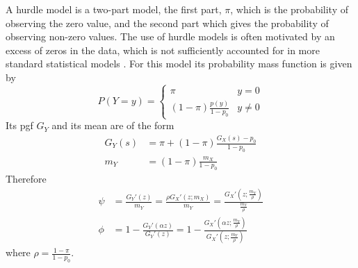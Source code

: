 \documentclass[useAMS,referee,usenatbib]{biom}
\begin{document}
A hurdle model is a two-part model, 
the first part, $\pi$, which is the probability of observing the  zero value, and the second part which gives the probability of observing non-zero values. 
The use of hurdle models is often motivated by an excess of zeros in the data, which is not sufficiently accounted for in more standard statistical models \cite{johnson2005univariate}. 
For this model its probability mass function is given by
\begin{equation*}\label{hd}
P(Y=y)= \left\{ \begin{array}{lc}
\pi & y=0 \\
(1-\pi)\frac{p(y)}{1-p_0}  & y\neq 0
\end{array}
\right.
\end{equation*}
Its pgf $G_Y$ and its mean are of the form
\begin{equation*}
\begin{split}
G_Y(s)&=\pi+(1-\pi)\frac{G_X(s)-p_0}{1-p_0}\\
m_Y&=(1-\pi)\frac{m_X}{1-p_0}
\end{split}
\end{equation*}
Therefore
\begin{equation}
\begin{split}
\psi&= \frac{G_Y'(z)}{m_Y}= \frac{\rho G_X'(z;m_X)}{ m_Y} =\frac{G_X'\left( z;\frac{m_Y}{\rho}\right) }{\frac{m_Y}{\rho}}\\
\phi&=1-\frac{G_Y'(\alpha z)}{G_Y'(z)}=1-\frac{G_X'\left( \alpha z;\frac{m_Y}{\rho}\right) }
{G_X'\left( z;\frac{m_Y}{\rho}\right) } 
\end{split}
\end{equation}
where $\rho=\frac{1-\pi}{1-p_0}$.

\end{document}
